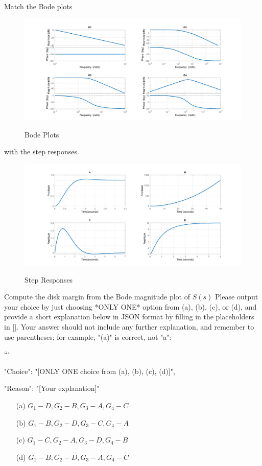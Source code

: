 \documentclass[12pt]{article}
\begin{document}
Match the Bode plots 
\begin{figure}[H]
    \centering
    \includegraphics[width=\textwidth]{figs/6.11-1.png}
    \label{fig:99}
    \caption{Bode Plots}
\end{figure}
with the step responses.
\begin{figure}[H]
    \centering
    \includegraphics[width=\textwidth]{figs/6.11-2.png}
    \label{fig:99}
    \caption{Step Responses}
\end{figure}
Compute the disk margin from the Bode magnitude plot of $S(s)$ 
Please output your choice by just choosing *ONLY ONE* option from (a), (b), (c), or (d), and provide a short explanation below in JSON format by filling in the placeholders in []. Your answer should not include any further explanation, and remember to use parentheses; for example, "(a)" is correct, not "a":

```
{

"Choice": "[ONLY ONE choice from (a), (b), (c), (d)]",

"Reason": "[Your explanation]"

}

\begin{itemize}
    \item[(a)] \(G_1-D,G_2-B,G_3-A,G_4-C\)
    \item[(b)] \(G_1-B,G_2-D,G_3-C,G_4-A\)
    \item[(c)] \(G_1-C,G_2-A,G_3-D,G_4-B\)
    \item[(d)] \(G_1-B,G_2-D,G_3-A,G_4-C\)
\end{itemize}
\end{document}
